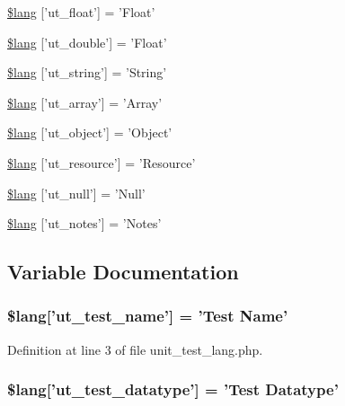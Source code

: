 \begin{DoxyCompactItemize}
\item 
\hyperlink{unit__test__lang_8php_a0f8267057369911f12753bdef18154cf}{\$lang} \mbox{[}'ut\-\_\-float'\mbox{]} = 'Float'
\item 
\hyperlink{unit__test__lang_8php_a4c75bfa3ef771d6952b724b23d752b8e}{\$lang} \mbox{[}'ut\-\_\-double'\mbox{]} = 'Float'
\item 
\hyperlink{unit__test__lang_8php_ab5097b676a29051de6c07955d59659d1}{\$lang} \mbox{[}'ut\-\_\-string'\mbox{]} = 'String'
\item 
\hyperlink{unit__test__lang_8php_a3d6aa3d4ed503f15adc21813a9018950}{\$lang} \mbox{[}'ut\-\_\-array'\mbox{]} = 'Array'
\item 
\hyperlink{unit__test__lang_8php_a771c29e5029c601b1f3e7c4e6fb93c94}{\$lang} \mbox{[}'ut\-\_\-object'\mbox{]} = 'Object'
\item 
\hyperlink{unit__test__lang_8php_a6653a67c4fc0bc5ade6aaf327eed05bf}{\$lang} \mbox{[}'ut\-\_\-resource'\mbox{]} = 'Resource'
\item 
\hyperlink{unit__test__lang_8php_ad4aef71cf1e43fa884add4613da590cb}{\$lang} \mbox{[}'ut\-\_\-null'\mbox{]} = 'Null'
\item 
\hyperlink{unit__test__lang_8php_a4d80b77ed0c51d05d5abdc88afa1b540}{\$lang} \mbox{[}'ut\-\_\-notes'\mbox{]} = 'Notes'
\end{DoxyCompactItemize}


\subsection{Variable Documentation}
\hypertarget{unit__test__lang_8php_ad25baa7cab208cbe1fbe6f6913b0e18c}{
\subsubsection[{\$lang}]{\setlength{\rightskip}{0pt plus 5cm}\$lang\mbox{[}'ut\-\_\-test\-\_\-name'\mbox{]} = '{\bf Test} Name'}}\label{unit__test__lang_8php_ad25baa7cab208cbe1fbe6f6913b0e18c}


Definition at line 3 of file unit\-\_\-test\-\_\-lang.\-php.

\hypertarget{unit__test__lang_8php_a141cfe44ef46b61362f161bc0cf220bc}{
\subsubsection[{\$lang}]{\setlength{\rightskip}{0pt plus 5cm}\$lang\mbox{[}'ut\-\_\-test\-\_\-datatype'\mbox{]} = '{\bf Test} Datatype'}}\label{unit__test__lang_8php_a141cfe44ef46b61362f161bc0cf220bc}


